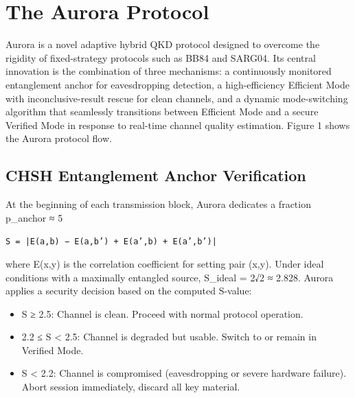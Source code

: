 \section{The Aurora Protocol}
Aurora is a novel adaptive hybrid QKD protocol designed to overcome the rigidity of fixed-strategy protocols such as BB84 and SARG04. Its central innovation is the combination of three mechanisms: a continuously monitored entanglement anchor for eavesdropping detection, a high-efficiency Efficient Mode with inconclusive-result rescue for clean channels, and a dynamic mode-switching algorithm that seamlessly transitions between Efficient Mode and a secure Verified Mode in response to real-time channel quality estimation. Figure 1 shows the Aurora protocol flow.

\begin{figure}[hbt!]
\centering
{}
\end{figure}
\subsection{CHSH Entanglement Anchor Verification}
At the beginning of each transmission block, Aurora dedicates a fraction p_anchor ≈ 5%

\texttt{S = |E(a,b) − E(a,b') + E(a',b) + E(a',b')|}

where E(x,y) is the correlation coefficient for setting pair (x,y). Under ideal conditions with a maximally entangled source, S_ideal = 2√2 ≈ 2.828. Aurora applies a security decision based on the computed S-value:

\begin{itemize}
\item S ≥ 2.5: Channel is clean. Proceed with normal protocol operation.
\item 2.2 ≤ S < 2.5: Channel is degraded but usable. Switch to or remain in Verified Mode.
\item S < 2.2: Channel is compromised (eavesdropping or severe hardware failure). Abort session immediately, discard all key material.
\end{itemize}


